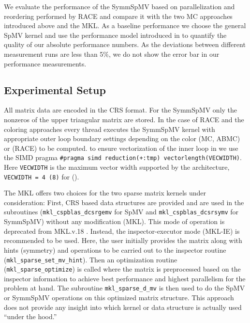 
We evaluate the performance of the \acrshort{SymmSpMV} based on parallelization and reordering performed by \acrshort{RACE} and compare it with the two MC approaches introduced above and the \acrshort{MKL}. 
As a   baseline performance we choose the general \acrshort{SpMV} kernel and use the performance model introduced in  to quantify the quality of our absolute performance numbers.
As the deviations between different measurement runs are less than 5\%, we do  not show the 
error bar in our performance measurements.

\subsection{Experimental Setup}

All matrix data are encoded in the CRS format. For the \acrshort{SymmSpMV}  only the nonzeros of the upper triangular matrix are stored. In the case of RACE and the coloring approaches every thread executes the \acrshort{SymmSpMV} kernel  with appropriate outer loop boundary settings depending on the color (MC, ABMC) or \levelGroups (\acrshort{RACE}) to be computed. 
\Inorder to ensure vectorization of the inner loop in  we use the SIMD pragma \texttt{\#pragma simd reduction(+:tmp) vectorlength(VECWIDTH)}. Here \texttt{VECWIDTH} is the maximum vector width supported by the architecture, \ie \texttt{VECWIDTH = 4 (8)} for \IVB (\SKX). 

The  \acrshort{MKL} offers two choices for the two sparse matrix kernels under consideration: First, CRS based data structures are provided and are used in the subroutines (\texttt{mkl\_cspblas\_dcsrgemv} for \acrshort{SpMV}  and  \texttt{mkl\_cspblas\_dcsrsymv} for \acrshort{SymmSpMV}) without any modification (MKL). This mode of operation is deprecated from \acrshort{MKL}.v.18 . Instead, the inspector-executor mode (MKL-IE) is recommended to be used. Here, the user initially provides the matrix along with hints (\eg symmetry) and operations to be carried out to the inspector routine (\texttt{mkl\_sparse\_set\_mv\_hint}). Then an optimization routine (\texttt{mkl\_sparse\_optimize}) is called where the matrix is  preprocessed based on the inspector information to achieve best performance and highest parallelism for the problem at hand. The subroutine \texttt{mkl\_sparse\_d\_mv} is then used to do the \acrshort{SpMV} or \acrshort{SymmSpMV} operations on this optimized matrix structure. This approach does not provide any insight into which kernel or data structure is actually used ``under the hood.''

